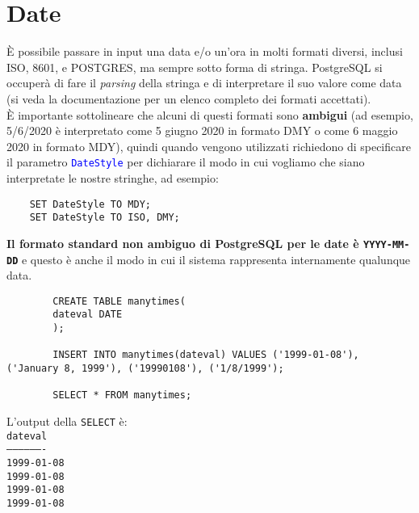 \documentclass[12pt,a4paper]{book}
\begin{document}
	\section{Date} È possibile passare in input una data e/o un'ora in molti formati diversi, inclusi ISO, 8601, e POSTGRES, ma sempre sotto forma di stringa. PostgreSQL si occuperà di fare il \textit{parsing} della stringa e di interpretare il suo valore come data (si veda la documentazione per un elenco completo dei formati accettati).\\È importante sottolineare che alcuni di questi formati sono \textbf{ambigui} (ad esempio, 5/6/2020 è interpretato come 5 giugno 2020 in formato DMY o come 6 maggio 2020 in formato MDY), quindi quando vengono utilizzati richiedono di specificare il parametro \textcolor{blue}{\texttt{DateStyle}} per dichiarare il modo in cui vogliamo che siano interpretate le nostre stringhe, ad esempio:
	\begin{lstlisting}
	SET DateStyle TO MDY;
	SET DateStyle TO ISO, DMY;
	\end{lstlisting}
	\textbf{Il formato standard non ambiguo di PostgreSQL per le date è \texttt{YYYY-MM-DD}} e questo è anche il modo in cui il sistema rappresenta internamente qualunque data.\vspace{10px}
	\begin{tcolorbox}[enhanced jigsaw, breakable,title=Esempio, title filled]
		\begin{lstlisting}
		CREATE TABLE manytimes(
		dateval DATE
		);
		
		INSERT INTO manytimes(dateval) VALUES ('1999-01-08'), ('January 8, 1999'), ('19990108'), ('1/8/1999');
		
		SELECT * FROM manytimes;
		\end{lstlisting}
		L'output della \texttt{SELECT} è:\vspace{10px}\\
		\texttt{dateval\\-------------------\\1999-01-08\\1999-01-08\\1999-01-08\\1999-01-08}\vspace{10px}
	\end{tcolorbox}
\end{document}
